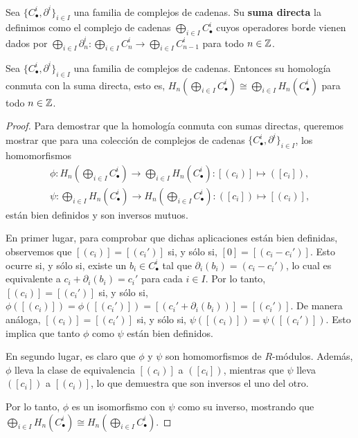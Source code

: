\begin{definicion}
	Sea \(\{C_{\bullet}^{i}, \partial^{i}\}_{i \in I}\) una familia de complejos de cadenas.
	Su \textbf{suma directa} la definimos como el complejo de cadenas \(\bigoplus_{i
		\in I}C^{i}_{\bullet}\) cuyos operadores borde vienen dados por \(\bigoplus_{i
		\in I}{\partial}^{i}_{n}: \bigoplus_{i \in I}C^{i}_{n}\to \bigoplus_{i \in I}C^{i}
	_{n-1}\) para todo \(n \in \mathbb{Z}\).
\end{definicion}
\begin{proposicion}
	\label{prop:hom-free-commute} Sea \(\{C_{\bullet}^{i}, \partial^{i}\}_{i \in I}\)
	una familia de complejos de cadenas. Entonces su homología conmuta con la suma
	directa, esto es,
	\(H_{n}(\bigoplus_{i \in I}C_{\bullet}^{i}) \cong \bigoplus_{i \in I}H_{n}(C_{\bullet}
	^{i})\)
	para todo \(n \in \mathbb{Z}\).
\end{proposicion}
\begin{proof}
	Para demostrar que la homología conmuta con sumas directas, queremos mostrar
	que para una colección de complejos de cadenas
	\(\{C_{\bullet}^{i}, \partial^{i}\}_{i \in I}\), los homomorfismos
	\begin{align*}
		\phi: H_{n}\left( \bigoplus_{i \in I}C_{\bullet}^{i}\right) \rightarrow \bigoplus_{i \in I}H_{n}(C_{\bullet}^{i}) : [(c_{i})] \mapsto ([c_{i}]), \\
		\psi: \bigoplus_{i \in I}H_{n}(C_{\bullet}^{i}) \rightarrow H_{n}\left( \bigoplus_{i \in I}C_{\bullet}^{i}\right) : ([c_{i}]) \mapsto [(c_{i})],
	\end{align*}
	están bien definidos y son inversos mutuos.
	
	En primer lugar, para comprobar que dichas aplicaciones están bien definidas, observemos
	que \([(c_{i})] = [(c_{i}')]\) si, y sólo si, \([0] = [(c_{i}- c_{i}')]\). Esto
	ocurre si, y sólo si, existe un \(b_{i}\in C_{\bullet}^{i}\) tal que
	\(\partial_{i}(b_{i}) = (c_{i}- c_{i}')\), lo cual es equivalente a \(c_{i}+ \partial
	_{i}(b_{i}) = c_{i}'\) para cada \(i \in I\). Por lo tanto, \([(c_{i})] = [(c_{i}')
	]\) si, y sólo si, \(\phi([(c_{i})]) = \phi([(c_{i}')]) = [(c_{i}' + \partial_{i}
	(b_{i}))] = [(c_{i}')]\). De manera análoga, \([(c_{i})] = [(c_{i}')]\) si, y
	sólo si, \(\psi([(c_{i})]) = \psi([(c_{i}')])\). Esto implica que tanto \(\phi\)
	como \(\psi\) están bien definidos.
	
	En segundo lugar, es claro que \(\phi\) y \(\psi\) son homomorfismos de \(R\)-módulos.
	Además, \(\phi\) lleva la clase de equivalencia \([(c_{i})]\) a \(([c_{i}])\),
	mientras que \(\psi\) lleva \(([c_{i}])\) a \([(c_{i})]\), lo que demuestra que son inversos
	el uno del otro.
	
	Por lo tanto, \(\phi\) es un isomorfismo con \(\psi\) como su inverso, mostrando que
	\(\bigoplus_{i \in I}H_{n}(C_{\bullet}^{i}) \cong H_{n}\left( \bigoplus_{i \in
		I}C_{\bullet}^{i}\right)\).
\end{proof}

